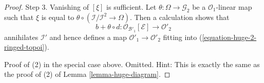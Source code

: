 \documentclass[10pt,a4paper]{amsart}
\theoremstyle{plain}
\theoremstyle{definition}
\theoremstyle{remark}
\numberwithin{equation}{subsection}
\begin{document}
\begin{proof}
\medskip\noindent
Step 3. Vanishing of $[\xi]$ is sufficient. Let
$\theta : \Omega \to \mathcal{G}_2$ be a $\mathcal{O}_1$-linear map
such that $\xi$ is equal to
$\theta \circ (\mathcal{I}/\mathcal{I}^2 \to \Omega)$.
Then a calculation shows that
$$
b + \theta \circ d :
\mathcal{O}_{\mathcal{B}'_1}[\mathcal{E}]
\longrightarrow
\mathcal{O}'_2
$$
annihilates $\mathcal{I}'$ and hence defines a map
$\mathcal{O}'_1 \to \mathcal{O}'_2$ fitting into
(\ref{equation-huge-2-ringed-topoi}).

\medskip\noindent
Proof of (2) in the special case above. Omitted. Hint:
This is exactly the same as the proof of (2) of
Lemma \ref{lemma-huge-diagram}.
\end{proof}
\end{document}
